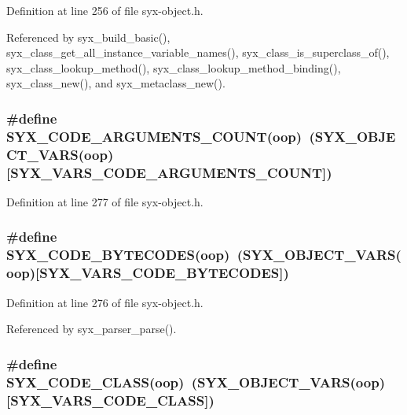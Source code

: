 Definition at line 256 of file syx-object.h.

Referenced by syx\_\-build\_\-basic(), syx\_\-class\_\-get\_\-all\_\-instance\_\-variable\_\-names(), syx\_\-class\_\-is\_\-superclass\_\-of(), syx\_\-class\_\-lookup\_\-method(), syx\_\-class\_\-lookup\_\-method\_\-binding(), syx\_\-class\_\-new(), and syx\_\-metaclass\_\-new().\hypertarget{syx-object_8h_b5c4f1e16d1d4ac619621ab96b12d009}{
\subsubsection{\setlength{\rightskip}{0pt plus 5cm}\#define SYX\_\-CODE\_\-ARGUMENTS\_\-COUNT(oop)~(SYX\_\-OBJECT\_\-VARS(oop)\mbox{[}SYX\_\-VARS\_\-CODE\_\-ARGUMENTS\_\-COUNT\mbox{]})}}
\label{syx-object_8h_b5c4f1e16d1d4ac619621ab96b12d009}




Definition at line 277 of file syx-object.h.\hypertarget{syx-object_8h_71157b1d4bedfbd25c8436122ddb24fd}{
\subsubsection{\setlength{\rightskip}{0pt plus 5cm}\#define SYX\_\-CODE\_\-BYTECODES(oop)~(SYX\_\-OBJECT\_\-VARS(oop)\mbox{[}SYX\_\-VARS\_\-CODE\_\-BYTECODES\mbox{]})}}
\label{syx-object_8h_71157b1d4bedfbd25c8436122ddb24fd}




Definition at line 276 of file syx-object.h.

Referenced by syx\_\-parser\_\-parse().\hypertarget{syx-object_8h_456cf11d874f9f0553fadd714775316d}{
\subsubsection{\setlength{\rightskip}{0pt plus 5cm}\#define SYX\_\-CODE\_\-CLASS(oop)~(SYX\_\-OBJECT\_\-VARS(oop)\mbox{[}SYX\_\-VARS\_\-CODE\_\-CLASS\mbox{]})}}
\label{syx-object_8h_456cf11d874f9f0553fadd714775316d}




